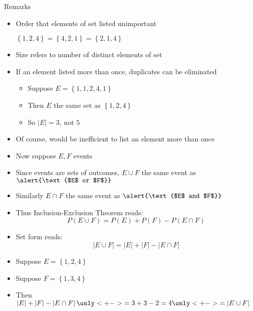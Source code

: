 \documentclass{beamer}
\theoremstyle{definition}
\begin{document}
\begin{frame}{Remarks}
\begin{itemize}
\item Order that elements \alert{of set} listed unimportant
\begin{example}
$\left\{1,2,4\right\}=\left\{4,2,1\right\}=\left\{2,1,4\right\}$
\end{example}
\item Size refers to number of \alert{distinct} elements
of set
\item If an element listed more than once, duplicates can be eliminated
\begin{example}
\begin{itemize}
\item Suppose $E=\left\{1,1,2,4,1\right\}$
\item Then $E$ the same set as $\left\{1,2,4\right\}$
\item So $\left|E\right|=3$, not $5$
\end{itemize}
\end{example}
\item Of course, would be inefficient to list
an element more than once
\end{itemize}
\end{frame}

\begin{frame}
\begin{itemize}
\item Now suppose $E,F$ events
\item Since events are sets of outcomes,
$E\cup F$ the same event as $\alert{\text{$E$ or $F$}}$
\item Similarly
$E\cap F$ the same event as $\alert{\text{$E$ and $F$}}$
\item Thus Inclusion-Exclusion Theorem reads:
\[P\left(E\cup F\right)=P\left(E\right)
+P\left(F\right)-P\left(E\cap F\right)\]
\item Set form reads:
\[\left|E\cup F\right|=\left|E\right|
+\left|F\right|-\left|E\cap F\right|\]
\end{itemize}
\begin{example}
\begin{itemize}
\item Suppose $E=\left\{1,2,4\right\}$
\item Suppose $F=\left\{1,3,4\right\}$
\item Then $\left|E\right|
+\left|F\right|-\left|E\cap F\right|
\only<+->{=3+3-2=4}
\only<+->{=\left|E\cup F\right|}$
\end{itemize}
\end{example}
\end{frame}
\end{document}
